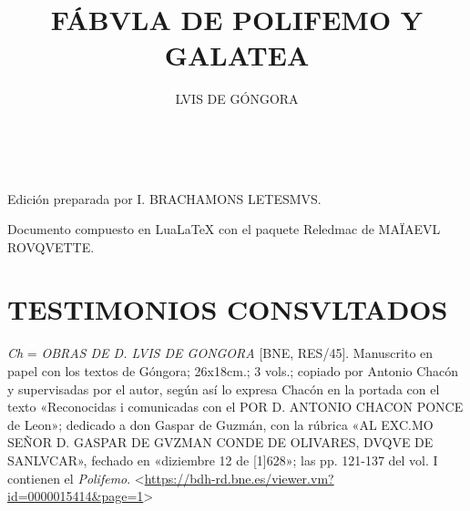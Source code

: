 \documentclass[11pt,a4paper,twoside]{article}
\title{FÁBVLA DE POLIFEMO Y GALATEA}
\author{\fontsize{14}{11.96}\selectfont LVIS DE GÓNGORA}
\date{\vspace{60pt}\fontsize{11}{11}\selectfont{TEXTO Y VARIANTES DE LA REDACCIÓN PRIMITIVA}\\\fontsize{40}{11}\selectfont{\vfill\LaTeX}}
\begin{document}
	{
			\maketitle
		}
		\newpage%

\hskip0pt
\vfill
\begin{flushright}
    Edición preparada por {\fontsize{9}{1}\selectfont I. BRACHAMONS LETESMVS}.
\end{flushright}

\begin{flushright}
	Documento compuesto en LuaLaTeX con el paquete Reledmac de {\fontsize{9}{11}\selectfont MAÏAEVL ROVQVETTE}.
\end{flushright}
\newpage
%
\tableofcontents
\newpage
%
\setcounter{page}{1}
\section*{\fontsize{11}{14}\selectfont TESTIMONIOS CONSVLTADOS}

\textit{Ch} = \textit{\fontsize{9}{11}\selectfont OBRAS DE D. LVIS DE GONGORA} [BNE, RES/45].
%
Manuscrito en papel con los textos de Góngora; 26x18cm.; 3 vols.; copiado por Antonio Chacón y supervisadas por el autor, según así lo expresa Chacón en la portada con el texto «Reconocidas i comunicadas con el {\fontsize{9}{11}\selectfont POR D. ANTONIO CHACON PONCE} de Leon»; dedicado a don Gaspar de Guzmán, con la rúbrica «{\fontsize{9}{11}\selectfont AL EXC.MO SEÑOR D. GASPAR DE GVZMAN CONDE DE OLIVARES, DVQVE DE SANLVCAR}», fechado en «diziembre 12 de [1]628»; las pp. 121-137 del vol. I contienen el \textit{Polifemo}. <\url{https://bdh-rd.bne.es/viewer.vm?id=0000015414&page=1}>\par
\end{document}

